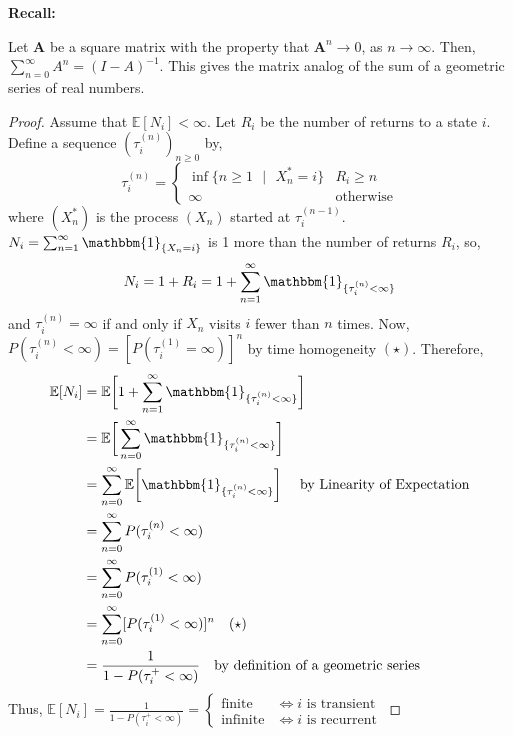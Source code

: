 \documentclass{tufte-handout}
\begin{document}
  \begin{marginfigure}
  \textbf{Recall:}

  \noindent Let $\boldsymbol{A}$ be a square matrix with the property that $\boldsymbol{A}^n \rightarrow 0$, as $n \rightarrow \infty$. Then, $\sum_{n=0}^{\infty}A^n = (I - A)^{-1}$. This gives the matrix analog of the sum of a geometric series of real numbers.
  \end{marginfigure}

  \begin{proof}
    Assume that $\mathbb{E}[N_i] < \infty$. Let $R_i$ be the number of returns to a state $i$. Define a sequence $(\tau^{(n)}_i)_{n \geq 0}$ by,
    \[\tau^{(n)}_i = \begin{cases}
      \inf \{n \geq 1 \text{ $|$ } X^*_n = i\} & R_i \geq n\\
      \infty & \text{otherwise}
    \end{cases}\]
    \noindent where $(X^*_n)$ is the process $(X_n)$ started at $\tau^{(n-1)}_i$. $N_i = \sum_{n=1}^{\infty} \mathbbm{1}_{\{X_n = i\}}$ is 1 more than the number of returns $R_i$, so,
    \[N_i = 1 + R_i = 1 + \sum_{n=1}^{\infty} \mathbbm{1}_{\{\tau^{(n)}_i < \infty\}}\]
    \noindent and $\tau^{(n)}_i = \infty$ if and only if $X_n$ visits $i$ fewer than $n$ times. Now, $P(\tau^{(n)}_i < \infty) = [P(\tau^{(1)}_i = \infty)]^n$ by time homogeneity $(\star)$. Therefore,
    \begin{align*}
      \mathbb{E}[N_i] &= \mathbb{E}\bigg[1 + \sum_{n=1}^{\infty} \mathbbm{1}_{\{\tau^{(n)}_i < \infty\}}\bigg] \\
      &= \mathbb{E}\bigg[\sum_{n=0}^{\infty} \mathbbm{1}_{\{\tau^{(n)}_i < \infty\}}\bigg] \\
      &= \sum_{n=0}^{\infty} \mathbb{E}\bigg[\mathbbm{1}_{\{\tau^{(n)}_i < \infty\}}\bigg] \quad \text{ by Linearity of Expectation} \\
      &= \sum_{n=0}^{\infty} P(\tau^{(n)}_i < \infty) \\
      &= \sum_{n=0}^{\infty} P(\tau^{(1)}_i < \infty) \\
      &= \sum_{n=0}^{\infty} [P(\tau^{(1)}_i < \infty)]^n \quad (\star) \\
      &= \frac{1}{1 - P(\tau^+_i < \infty)} \quad \text{by definition of a geometric series}
    \end{align*}
    \noindent Thus, $\mathbb{E}[N_i] = \frac{1}{1 - P(\tau^+_i < \infty)}  = \begin{cases}
                          \text{finite} & \text{$\iff i$ is transient} \\
                          \text{infinite} & \text{$\iff i$ is recurrent}
                        \end{cases}$
  \end{proof}
\end{document}
